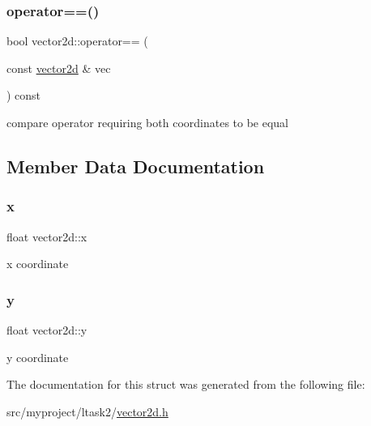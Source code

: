 \subsubsection{\texorpdfstring{operator==()}{operator==()}}
{\footnotesize\ttfamily bool vector2d\+::operator== (\begin{DoxyParamCaption}\item[{const \hyperlink{structvector2d}{vector2d} \&}]{vec }\end{DoxyParamCaption}) const\hspace{0.3cm}{\ttfamily [inline]}}



compare operator requiring both coordinates to be equal 



\subsection{Member Data Documentation}
\mbox{\label{structvector2d_afc31641006a6413e6c0257ed31b98909}} 
\subsubsection{\texorpdfstring{x}{x}}
{\footnotesize\ttfamily float vector2d\+::x}



x coordinate 

\mbox{\label{structvector2d_a25beea3d3ebc2877e99dec95a889ef7a}} 
\subsubsection{\texorpdfstring{y}{y}}
{\footnotesize\ttfamily float vector2d\+::y}



y coordinate 



The documentation for this struct was generated from the following file\+:\begin{DoxyCompactItemize}
\item 
src/myproject/ltask2/\hyperlink{vector2d_8h}{vector2d.\+h}\end{DoxyCompactItemize}
